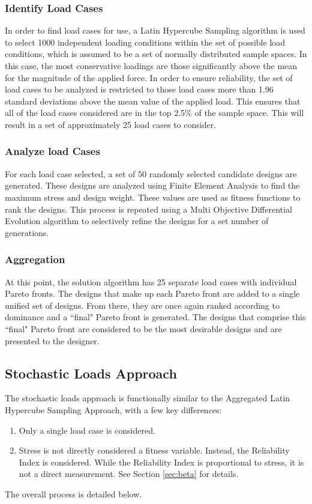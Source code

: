 \subsubsection{Identify Load Cases}
In order to find load cases for use, a Latin Hypercube Sampling algorithm is used to select 1000 independent loading conditions within the set of possible load conditions, which is assumed to be a set of normally distributed sample spaces. In this case, the most conservative loadings are those significantly above the mean for the magnitude of the applied force. In order to ensure reliability, the set of load cases to be analyzed is restricted to those load cases more than 1.96 standard deviations above the mean value of the applied load. This ensures that all of the load cases considered are in the top 2.5\% of the sample space. This will result in a set of approximately 25 load cases to consider. 
\subsubsection{Analyze load Cases} 
For each load case selected, a set of 50 randomly selected candidate designs are generated. These designs are analyzed using Finite Element Analysis to find the maximum stress and design weight. These values are used as fitness functions to rank the designs. This process is repeated using a Multi Objective Differential Evolution algorithm to selectively refine the designs for a set number of generations.
\subsubsection{Aggregation}
At this point, the solution algorithm has 25 separate load cases with individual Pareto fronts. The designs that make up each Pareto front are added to a single unified set of designs. From there, they are once again ranked according to dominance and a ``final" Pareto front is generated. The designs that comprise this ``final" Pareto front are considered to be the most desirable designs and are presented to the designer.

\subsection{Stochastic Loads Approach}
The stochastic loads approach is functionally similar to the Aggregated Latin Hypercube Sampling Approach, with a few key differences: 

\begin{enumerate}
\item Only a single load case is considered. 
\item Stress is not directly considered a fitness variable. Instead, the Reliability Index is considered. While the Reliability Index is proportional to stress, it is not a direct measurement. See Section \ref{sec:beta} for details. 
\end{enumerate}
The overall process is detailed below. 


